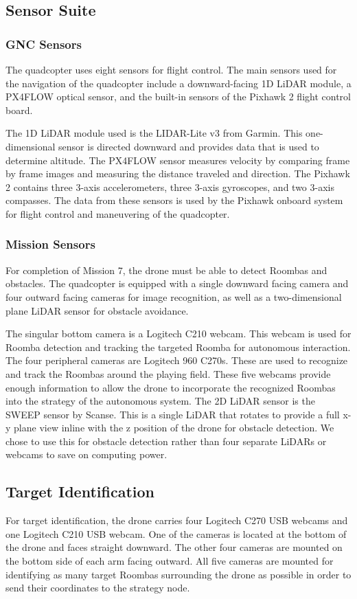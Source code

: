 \documentclass[12pt,letterpaper]{article}
\begin{document}
	\subsection*{Sensor Suite}
		\subsubsection*{GNC Sensors}
			The quadcopter uses eight sensors for flight control. The main sensors used for the navigation of the quadcopter include a downward-facing 1D LiDAR module, a PX4FLOW optical sensor, and the built-in sensors of the Pixhawk 2 flight control board.

			The 1D LiDAR module used is the LIDAR-Lite v3 from Garmin. This one-dimensional sensor is directed downward and provides data that is used to determine altitude. The PX4FLOW sensor measures velocity by comparing frame by frame images and measuring the distance traveled and direction. The Pixhawk 2 contains three 3-axis accelerometers, three 3-axis gyroscopes, and two 3-axis compasses. The data from these sensors is used by the Pixhawk onboard system for flight control and maneuvering of the quadcopter.

		\subsubsection*{Mission Sensors}
			For completion of Mission 7, the drone must be able to detect Roombas and obstacles. The quadcopter is equipped with a single downward facing camera and four outward facing cameras for image recognition, as well as a two-dimensional plane LiDAR sensor for obstacle avoidance.

			The singular bottom camera is a Logitech C210 webcam. This webcam is used for Roomba detection and tracking the targeted Roomba for autonomous interaction. The four peripheral cameras are Logitech 960 C270s. These are used to recognize and track the Roombas around the playing field. These five webcams provide enough information to allow the drone to incorporate the recognized Roombas into the strategy of the autonomous system.
			The 2D LiDAR sensor is the SWEEP sensor by Scanse. This is a single LiDAR that rotates to provide a full x-y plane view inline with the z position of the drone for obstacle detection. We chose to use this for obstacle detection rather than four separate LiDARs or webcams to save on computing power.


		\subsection*{Target Identification}
			For target identification, the drone carries four Logitech C270 USB webcams and one Logitech C210 USB webcam. One of the cameras is located at the bottom of the drone and faces straight downward. The other four cameras are mounted on the bottom side of each arm facing outward. All five cameras are mounted for identifying as many target Roombas surrounding the drone as possible in order to send their coordinates to the strategy node.
\end{document}
